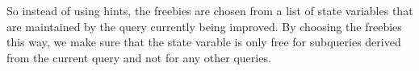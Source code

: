 So instead of using hints, the freebies are chosen from a list of state
variables that are maintained by the query currently being improved. By choosing
the freebies this way, we make sure that the state varable is only free for
subqueries derived from the current query and not for any other queries.
